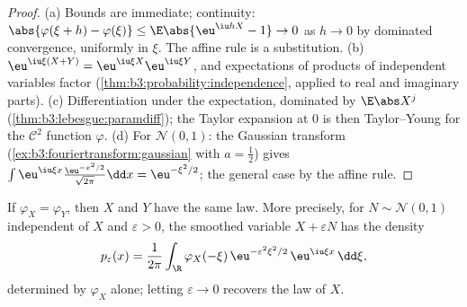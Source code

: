 \begin{proof}
(a) Bounds are immediate; continuity: $\abs{\varphi(\xi + h)
- \varphi(\xi)} \leq \E\abs{\eu^{\iu hX} - 1} \to 0$ as $h
\to 0$ by dominated convergence, uniformly in $\xi$. The
affine rule is a substitution. (b) $\eu^{\iu\xi(X+Y)} =
\eu^{\iu\xi X}\eu^{\iu\xi Y}$, and expectations of products
of independent variables factor
(\cref{thm:b3:probability:independence}, applied to real and
imaginary parts). (c) Differentiation under the expectation,
dominated by $\E\abs X^j$
(\cref{thm:b3:lebesgue:paramdiff}); the Taylor expansion at
$0$ is then Taylor--Young for the $\mathcal C^2$ function
$\varphi$. (d) For $\mathcal N(0,1)$: the Gaussian transform
(\cref{ex:b3:fouriertransform:gaussian} with $a = \frac12$)
gives $\int\eu^{\iu\xi x}\frac{\eu^{-x^2/2}}{\sqrt{2\pi}}\dd
x = \eu^{-\xi^2/2}$; the general case by the affine rule.
\end{proof}

\begin{theorem}[Injectivity]\label{thm:b3:clt:injectivity}
If $\varphi_X = \varphi_Y$, then $X$ and $Y$ have the same
law. More precisely, for $N \sim \mathcal N(0,1)$ independent
of $X$ and $\varepsilon > 0$, the smoothed variable $X +
\varepsilon N$ has the density
\[
p_\varepsilon(x) = \frac1{2\pi}\int_\R
\varphi_X(-\xi)\,\eu^{-\varepsilon^2\xi^2/2}\,
\eu^{\iu\xi x}\,\dd\xi ,
\]
determined by $\varphi_X$ alone; letting $\varepsilon \to 0$
recovers the law of $X$.
\end{theorem}

